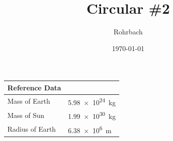 \documentclass[10pt]{exam}
\title{Circular \#2
}
\author{Rohrbach}
\date{\today}
\begin{document}
\maketitle

\newcommand{\printdata}{
  \begin{center}
    \begin{tabular}{ll}
      \hline
      Reference Data  & \\
      \hline
      Mass of Earth   & \SI{5.98e24}{\kilo\gram} \\
      Mass of Sun     & \SI{1.99e30}{\kilo\gram} \\
      Radius of Earth & \SI{6.38e6}{\meter}      \\
      \hline
    \end{tabular}
  \end{center}
}

\printdata
\end{document}
